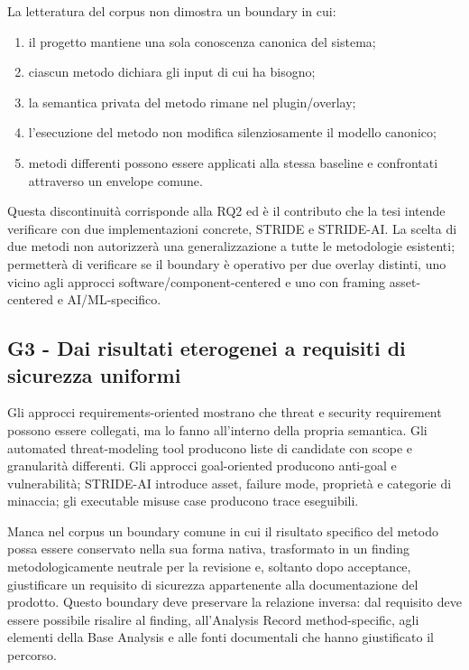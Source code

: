 \documentclass[12pt,a4paper,oneside]{report}
\begin{document}
La letteratura del corpus non dimostra un boundary in cui:

\begin{enumerate}[label=\alph*)]
\item il progetto mantiene una sola conoscenza canonica del sistema;
\item ciascun metodo dichiara gli input di cui ha bisogno;
\item la semantica privata del metodo rimane nel plugin/overlay;
\item l'esecuzione del metodo non modifica silenziosamente il modello canonico;
\item metodi differenti possono essere applicati alla stessa baseline e confrontati attraverso un envelope comune.
\end{enumerate}

Questa discontinuità corrisponde alla RQ2 ed è il contributo che la tesi intende verificare con due implementazioni concrete, STRIDE e STRIDE-AI. La scelta di due metodi non autorizzerà una generalizzazione a tutte le metodologie esistenti; permetterà di verificare se il boundary è operativo per due overlay distinti, uno vicino agli approcci software/component-centered e uno con framing asset-centered e AI/ML-specifico.

\subsection{G3 - Dai risultati eterogenei a requisiti di sicurezza uniformi}

Gli approcci requirements-oriented mostrano che threat e security requirement possono essere collegati, ma lo fanno all'interno della propria semantica. Gli automated threat-modeling tool producono liste di candidate con scope e granularità differenti. Gli approcci goal-oriented producono anti-goal e vulnerabilità; STRIDE-AI introduce asset, failure mode, proprietà e categorie di minaccia; gli executable misuse case producono trace eseguibili.

Manca nel corpus un boundary comune in cui il risultato specifico del metodo possa essere conservato nella sua forma nativa, trasformato in un finding metodologicamente neutrale per la revisione e, soltanto dopo acceptance, giustificare un requisito di sicurezza appartenente alla documentazione del prodotto. Questo boundary deve preservare la relazione inversa: dal requisito deve essere possibile risalire al finding, all'Analysis Record method-specific, agli elementi della Base Analysis e alle fonti documentali che hanno giustificato il percorso.
\end{document}
